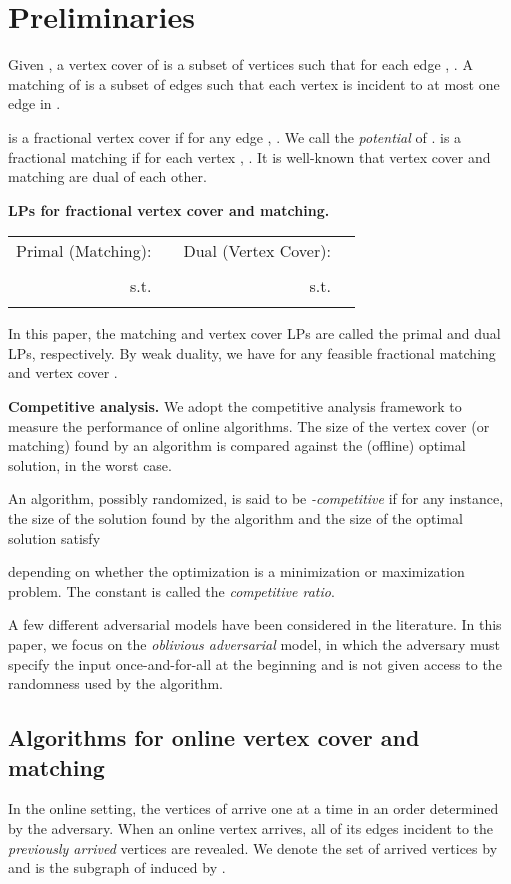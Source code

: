 \documentclass{article}
\begin{document}
\section{Preliminaries}


Given , a vertex cover of  is a subset of vertices  such that for each edge , . A matching of  is a subset of edges  such that each vertex  is incident to at most one edge in .

 is a fractional vertex cover if for any edge , . We call  the {\em potential} of .   is a fractional matching if for each vertex , . It is well-known that vertex cover and matching are dual of each other.

{\bf LPs for fractional vertex cover and matching.}

\begin{center}
\begin{tabular}{ | r l | r l | }
\hline
Primal (Matching): & & Dual (Vertex Cover): &\\
 &  &  &  \\
s.t. &  & s.t. &  \\
&   & &  \\
\hline
\end{tabular}
\end{center}

In this paper, the matching and vertex cover LPs are called the primal and dual LPs, respectively. By weak duality, we have  for any feasible fractional matching  and vertex cover .


{\bf Competitive analysis.}
We adopt the competitive analysis framework to measure the performance of online algorithms. The size of the vertex cover  (or matching) found by an algorithm is compared against the (offline) optimal solution, in the worst case.

An algorithm, possibly randomized, is said to be \textit{-competitive} if for any instance, the size of the solution  found by the algorithm and the size of the optimal solution  satisfy 

depending on whether the optimization is a minimization or maximization problem. The constant  is called the \textit{competitive ratio}.

A few different adversarial models have been considered in the literature. In this paper, we focus on the {\em oblivious adversarial} model, in which the adversary must specify the input once-and-for-all at the beginning and is not given access to the randomness used by the algorithm. 
\subsection{Algorithms for online vertex cover and matching}
In the online setting, the vertices of  arrive one at a time in an order determined by the adversary. When an online vertex  arrives, all of its edges incident to the {\em previously arrived} vertices are revealed. We denote the set of arrived vertices by  and  is the subgraph of  induced by .
\end{document}
